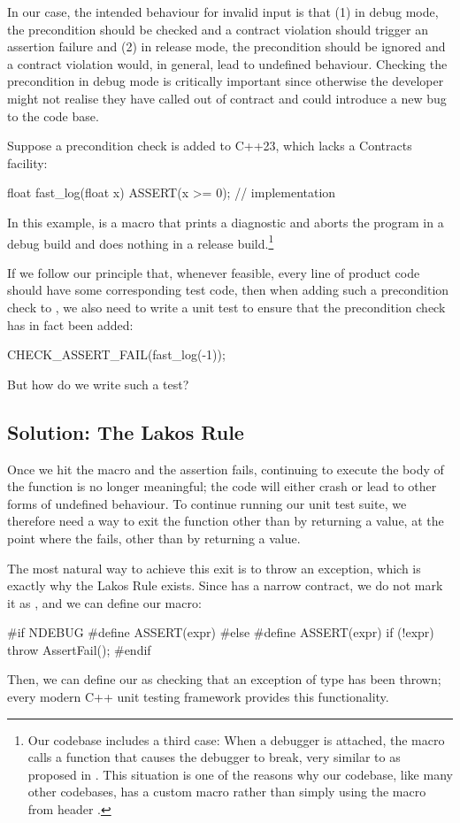 In our case, the intended behaviour for invalid input is that (1) in debug mode, the precondition  should be checked and a contract violation should trigger an assertion failure and (2) in release mode, the precondition should be ignored and a contract violation would, in general, lead to undefined behaviour. Checking the precondition in debug mode is critically important since otherwise the developer might not realise they have called  out of contract and could introduce a new bug to the code base.

Suppose a precondition check is added to C++23, which lacks a Contracts facility:
\begin{codeblock}
float fast_log(float x) {
  ASSERT(x >= 0);
  // implementation
}
\end{codeblock}
In this example,  is a macro that prints a diagnostic and aborts the program in a debug build and does nothing in a release build.\footnote{Our codebase includes a third case: When a debugger is attached, the macro calls a function that causes the debugger to break, very similar to  as proposed in \cite{P2514R0}. This situation is one of the reasons why our codebase, like many other codebases, has a custom  macro rather than simply using the  macro from header .}

If we follow our principle that, whenever feasible, every line of product code should have some corresponding test code, then when adding such a precondition check to , we also need to write a unit test to ensure that the precondition check has in fact been added:
\begin{codeblock}
CHECK_ASSERT_FAIL(fast_log(-1));
\end{codeblock}
But how do we write such a test?

\subsection{Solution: The Lakos Rule}
Once we hit the  macro and the assertion fails, continuing to execute the body of the function is no longer meaningful; the code will either crash or lead to other forms of undefined behaviour. To continue running our unit test suite, we therefore need a way to exit the function other than by returning a value, at the point where the  fails, other than by returning a value.

The most natural way to achieve this exit is to throw an exception, which is exactly why the Lakos Rule exists. Since  has a narrow contract, we do not mark it as , and we can define our  macro:
\begin{codeblock}
#if NDEBUG
  #define ASSERT(expr)
#else
  #define ASSERT(expr) if (!expr) throw AssertFail();
#endif
\end{codeblock}
Then, we can define our  as checking that an exception of type  has been thrown; every modern C++ unit testing framework provides this functionality.

